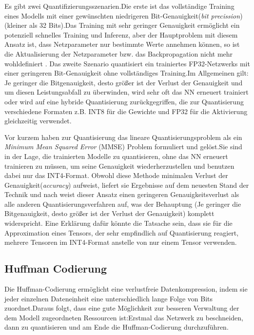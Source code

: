 \documentclass[12pt,a4paper]{scrartcl}
\numberwithin{equation}{section}
\begin{document}
Es gibt zwei Quantifizierungsszenarien.Die erste ist das vollständige Training eines Modells mit einer gewünschten niedrigeren Bit-Genauigkeit(\textit{bit precission})(kleiner als 32 Bits).Das Training mit sehr geringer Genauigkeit ermöglicht ein potenziell schnelles Training und Inferenz, aber der Hauptproblem mit diesem Ansatz ist, dass Netzparameter nur bestimmte Werte annehmen können, so ist die Aktualisierung der Netzparameter bzw. das Backpropagation nicht mehr wohldefiniert  \cite{quantizationYoni}.
Das zweite Szenario  quantisiert ein trainiertes FP32-Netzwerks mit einer geringeren Bit-Genauigkeit ohne vollständiges Training.Im Allgemeinen gilt: Je geringer die Bitgenauigkeit, desto größer ist der Verlust der Genauigkeit und um diesen Leistungsabfall zu überwinden, wird sehr oft das \ac{NN} erneuert trainiert oder wird auf eine hybride Quantisierung zurückgegriffen, die zur Quantisierung verschiedene Formaten z.B. INT8 für die Gewichte und FP32 für die Aktivierung gleichzeitig verwendet.

Vor kurzem haben \cite[Yoni et al]{quantizationYoni} zur  Quantisierung  das lineare Quantisierungsproblem als ein \textit{Minimum Mean Squared Error} (MMSE) Problem formuliert und gelöst.Sie sind in der Lage, die trainierten Modelle zu quantisieren, ohne das \ac{NN} erneuert trainieren zu müssen, um seine Genauigkeit wiederherzustellen und benutzen dabei nur das INT4-Format. Obwohl diese Methode  minimalen Verlust der Genauigkeit(\textit{accuracy}) aufweist, liefert sie Ergebnisse auf dem neuesten Stand der Technik und nach \cite{quantizationYoni} weist dieser Ansatz einen geringeren Genauigkeitsverlust als alle anderen Quantisierungsverfahren auf, was der Behauptung (Je geringer die Bitgenauigkeit, desto größer ist der Verlust der Genauigkeit) komplett widerspricht. Eine Erklärung dafür könnte die Tatsache sein, dass sie für die Approximation eines Tensors, der sehr empfindlich auf Quantisierung reagiert, mehrere Tensoren im INT4-Format anstelle von nur einem Tensor verwenden.

\subsection{Huffman Codierung}
Die Huffman-Codierung ermöglicht eine verlustfreie Datenkompression, indem sie jeder einzelnen Dateneinheit  eine unterschiedlich lange Folge von Bits zuordnet.Daraus folgt, dass eine gute Möglichkeit zur besseren Verwaltung der dem Modell zugeordneten Ressourcen ist:Erstmal das Netzwerk zu beschneiden, dann zu quantisieren und am Ende die Huffman-Codierung durchzuführen. 
\end{document}
